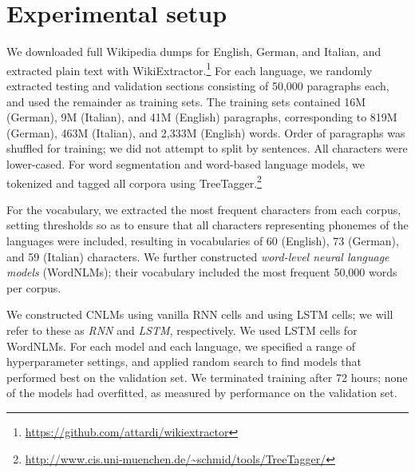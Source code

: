 \section{Experimental setup}
\label{sec:setup}

We downloaded full Wikipedia dumps for English, German, and Italian, and extracted plain text with WikiExtractor.\footnote{\url{https://github.com/attardi/wikiextractor}}
For each language, we randomly extracted testing and validation sections consisting of 50,000 paragraphs each, and used the remainder as training sets.
The training sets contained 16M (German), 9M (Italian), and 41M (English) paragraphs, corresponding to 819M (German), 463M (Italian), and 2,333M (English) words.
Order of paragraphs was shuffled for training; we did not attempt to split by sentences.
All characters were lower-cased.
For word segmentation and word-based language models, we tokenized and tagged all corpora using TreeTagger.\footnote{\url{http://www.cis.uni-muenchen.de/~schmid/tools/TreeTagger/}}

For the vocabulary, we extracted the most frequent characters from
each corpus, setting thresholds so as to ensure that all characters
representing phonemes of the languages were included, resulting in vocabularies of 60 (English), 73 (German), and 59 (Italian) characters.
We further constructed \emph{word-level neural language models} (WordNLMs); 
their vocabulary included the most frequent 50,000 words per corpus.

We constructed CNLMs using vanilla RNN cells and using LSTM cells; we will refer to these as \emph{RNN} and \emph{LSTM}, respectively.
We used LSTM cells for WordNLMs.
For each model and each language, we specified a range of hyperparameter settings, and applied random search to find models that performed best on the validation set.
We terminated training after 72 hours; none of the models had overfitted, as measured by performance on the validation set.

